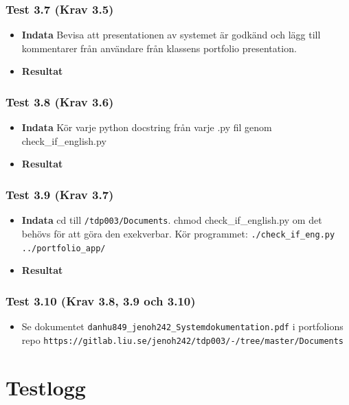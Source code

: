 \documentclass{TDP003mall}
\begin{document}
\subsubsection*{Test 3.7 (Krav 3.5)}
\begin{itemize}
\item[]\textbf{Indata} Bevisa att presentationen av systemet är godkänd och lägg till kommentarer från användare från klassens portfolio presentation.
\item[]\textbf{Resultat} 
\end{itemize}
\subsubsection*{Test 3.8 (Krav 3.6)}
\begin{itemize}
\item[]\textbf{Indata} Kör varje python docstring från varje .py fil genom check\_if\_english.py
\item[]\textbf{Resultat} 
\end{itemize}
\subsubsection*{Test 3.9 (Krav 3.7)}
\begin{itemize}
\item[]\textbf{Indata} cd till \texttt{/tdp003/Documents}. chmod check\_if\_english.py om det behövs för att göra den exekverbar. Kör programmet: \texttt{./check_if_eng.py ../portfolio_app/}
\item[]\textbf{Resultat} 
\end{itemize}
\subsubsection*{Test 3.10 (Krav 3.8, 3.9 och 3.10)}
\begin{itemize}
\item[] Se dokumentet \texttt{danhu849_jenoh242_Systemdokumentation.pdf} i portfolions repo \texttt{https://gitlab.liu.se/jenoh242/tdp003/-/tree/master/Documents}
\end{itemize}





\section{Testlogg}
\end{document}
